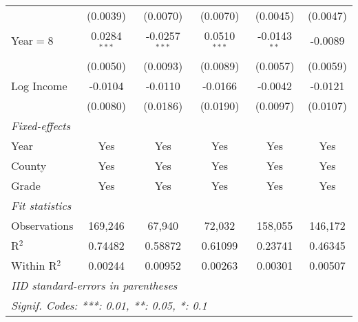 \begin{table}[htbp]
\begin{tabular}{lccccc}
                           & (0.0039)        & (0.0070)        & (0.0070)       & (0.0045)        & (0.0047)\\
      Year$=$8             & 0.0284$^{***}$  & -0.0257$^{***}$ & 0.0510$^{***}$ & -0.0143$^{**}$  & -0.0089\\
                           & (0.0050)        & (0.0093)        & (0.0089)       & (0.0057)        & (0.0059)\\
      Log Income           & -0.0104         & -0.0110         & -0.0166        & -0.0042         & -0.0121\\
                           & (0.0080)        & (0.0186)        & (0.0190)       & (0.0097)        & (0.0107)\\
      \midrule \emph{Fixed-effects} &   &   &   &   &  \\
      Year                 & Yes             & Yes             & Yes            & Yes             & Yes\\
      County               & Yes             & Yes             & Yes            & Yes             & Yes\\
      Grade                & Yes             & Yes             & Yes            & Yes             & Yes\\
      \midrule \emph{Fit statistics} &   &   &   &   &  \\
      Observations         & 169,246         & 67,940          & 72,032         & 158,055         & 146,172\\
      R$^2$                & 0.74482         & 0.58872         & 0.61099        & 0.23741         & 0.46345\\
      Within R$^2$         & 0.00244         & 0.00952         & 0.00263        & 0.00301         & 0.00507\\
      \midrule\midrule\multicolumn{6}{l}{\emph{IID standard-errors in parentheses}}\\
      \multicolumn{6}{l}{\emph{Signif. Codes: ***: 0.01, **: 0.05, *: 0.1}}\\
   \end{tabular}
\end{table}


